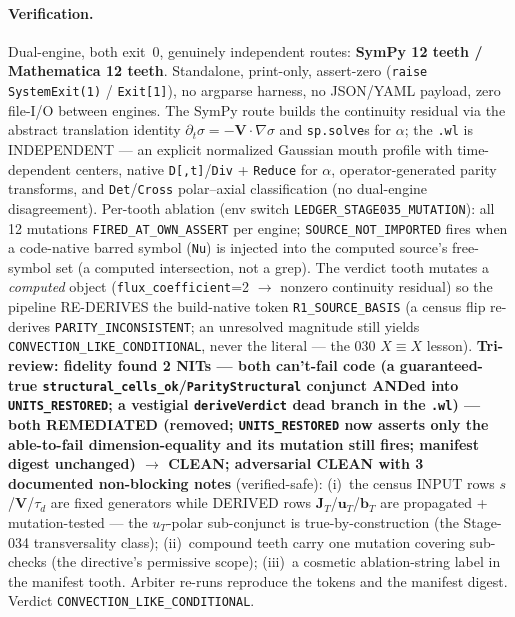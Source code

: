 \paragraph{Verification.}
Dual-engine, both exit~0, genuinely independent routes: \textbf{SymPy 12 teeth /
Mathematica 12 teeth}. Standalone, print-only, assert-zero
(\texttt{raise SystemExit(1)} / \texttt{Exit[1]}), no argparse harness, no JSON/YAML
payload, zero file-I/O between engines. The SymPy route builds the continuity
residual via the abstract translation identity
\(\partial_t\sigma=-\mathbf V\!\cdot\!\nabla\sigma\) and \texttt{sp.solve}s for
\(\alpha\); the \texttt{.wl} is INDEPENDENT --- an explicit normalized Gaussian
mouth profile with time-dependent centers, native \texttt{D[,t]}/\texttt{Div} +
\texttt{Reduce} for \(\alpha\), operator-generated parity transforms, and
\texttt{Det}/\texttt{Cross} polar--axial classification (no dual-engine
disagreement). Per-tooth ablation (env switch \texttt{LEDGER\_STAGE035\_MUTATION}):
all 12 mutations \texttt{FIRED\_AT\_OWN\_ASSERT} per engine;
\texttt{SOURCE\_NOT\_IMPORTED} fires when a code-native barred symbol (\texttt{Nu})
is injected into the computed source's free-symbol set (a computed intersection,
not a grep). The verdict tooth mutates a \emph{computed} object
(\texttt{flux\_coefficient}=2 \(\to\) nonzero continuity residual) so the pipeline
RE-DERIVES the build-native token \texttt{R1\_SOURCE\_BASIS} (a census flip
re-derives \texttt{PARITY\_INCONSISTENT}; an unresolved magnitude still yields
\texttt{CONVECTION\_LIKE\_CONDITIONAL}, never the literal --- the 030
\(X\equiv X\) lesson). \textbf{Tri-review: fidelity found 2 NITs --- both can't-fail
code (a guaranteed-true \texttt{structural\_cells\_ok}/\texttt{ParityStructural}
conjunct ANDed into \texttt{UNITS\_RESTORED}; a vestigial \texttt{deriveVerdict}
dead branch in the \texttt{.wl}) --- both REMEDIATED (removed; \texttt{UNITS\_RESTORED}
now asserts only the able-to-fail dimension-equality and its mutation still fires;
manifest digest unchanged) \(\to\) CLEAN; adversarial CLEAN with 3 documented
non-blocking notes} (verified-safe): (i)~the census INPUT rows \(s\)/\(\mathbf V\)/\(\tau_d\)
are fixed generators while DERIVED rows \(\mathbf J_T\)/\(\mathbf u_T\)/\(\mathbf b_T\)
are propagated + mutation-tested --- the \(u_T\)-polar sub-conjunct is
true-by-construction (the Stage-034 transversality class); (ii)~compound teeth carry
one mutation covering sub-checks (the directive's permissive scope); (iii)~a
cosmetic ablation-string label in the manifest tooth. Arbiter re-runs reproduce the
tokens and the manifest digest. Verdict \texttt{CONVECTION\_LIKE\_CONDITIONAL}.
